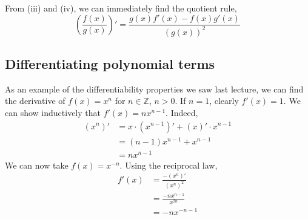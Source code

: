 \begin{remark}
	From (iii) and (iv), we can immediately find the quotient rule,
	\[
		\left( \frac{f(x)}{g(x)} \right)' = \frac{g(x)f'(x) - f(x)g'(x)}{(g(x))^2}
	\]
\end{remark}

\subsection{Differentiating polynomial terms}
As an example of the differentiability properties we saw last lecture, we can find the derivative of \(f(x) = x^n\) for \(n \in \mathbb Z\), \(n > 0\).
If \(n=1\), clearly \(f'(x) = 1\).
We can show inductively that \(f'(x) = nx^{n-1}\).
Indeed,
\begin{align*}
	(x^n)' & = x \cdot (x^{n-1})' + (x)' \cdot x^{n-1} \\
	       & = (n-1)x^{n-1} + x^{n-1}                  \\
	       & = nx^{n-1}
\end{align*}
We can now take \(f(x) = x^{-n}\).
Using the reciprocal law,
\begin{align*}
	f'(x) & = \frac{-(x^n)'}{(x^n)^2}  \\
	      & = \frac{-nx^{n-1}}{x^{2n}} \\
	      & = -nx^{-n-1}
\end{align*}

